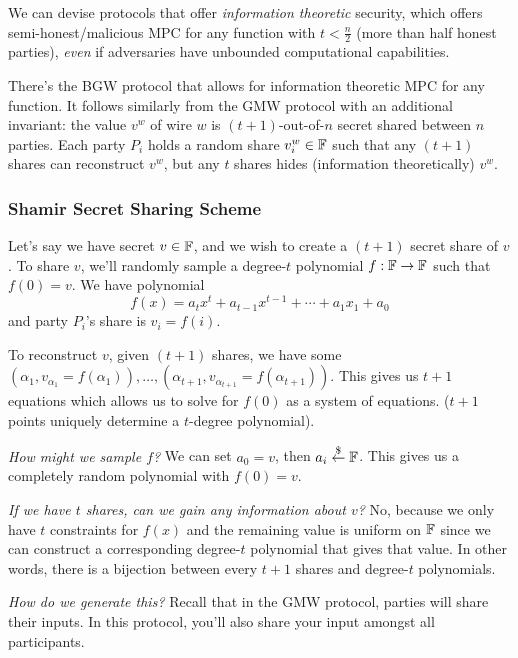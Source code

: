 We can devise protocols that offer \emph{information theoretic} security, which offers semi-honest/malicious MPC for any function with $t < \frac{n}{2}$ (more than half honest parties), \emph{even} if adversaries have unbounded computational capabilities.

There's the BGW protocol that allows for information theoretic MPC for any function. It follows similarly from the GMW protocol with an additional invariant: the value $v^w$ of wire $w$ is $(t+1)$-out-of-$n$ secret shared between $n$ parties. Each party $P_i$ holds a random share $v^w_i\in \mathbb F$ such that any $(t+1)$ shares can reconstruct $v^w$, but any $t$ shares hides (information theoretically) $v^w$.


\subsubsection{Shamir Secret Sharing Scheme}
Let's say we have secret $v\in \mathbb F$, and we wish to create a $(t+1)$ secret share of $v$. To share $v$, we'll randomly sample a degree-$t$ polynomial $f : \mathbb F\to \mathbb F$ such that $f(0) = v$. We have polynomial
\[f(x) = a_tx^t + a_{t-1}x^{t-1}+ \cdots + a_1x_1 + a_0\]
and party $P_i$'s share is $v_i = f(i)$.

To reconstruct $v$, given $(t+1)$ shares, we have some $(\alpha_1, v_{\alpha_1} = f(\alpha_1)), \dots, (\alpha_{t+1}, v_{\alpha_{t+1}} = f(\alpha_{t+1}))$. This gives us $t+1$ equations which allows us to solve for $f(0)$ as a system of equations. ($t+1$ points uniquely determine a $t$-degree polynomial).


\emph{How might we sample $f$?} We can set $a_0 = v$, then $a_i\overset{\$}{\leftarrow} \mathbb F$. This gives us a completely random polynomial with $f(0) = v$.

\emph{If we have $t$ shares, can we gain any information about $v$?} No, because we only have $t$ constraints for $f(x)$ and the remaining value is uniform on $\mathbb F$ since we can construct a corresponding degree-$t$ polynomial that gives that value. In other words, there is a bijection between every $t+1$ shares and degree-$t$ polynomials.

\emph{How do we generate this?} Recall that in the GMW protocol, parties will share their inputs. In this protocol, you'll also share your input amongst all participants.

